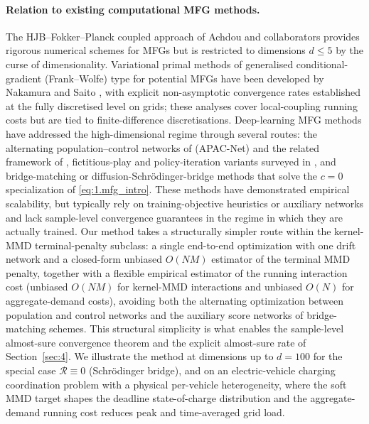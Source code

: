 \documentclass[11pt,leqno]{article}
\theoremstyle{plain}
\theoremstyle{remark}
\theoremstyle{definition}
\numberwithin{equation}{section}
\numberwithin{figure}{section}
\numberwithin{table}{section}
\numberwithin{algorithm}{section}
\begin{document}
\paragraph{Relation to existing computational MFG methods.}
The HJB--Fokker--Planck coupled approach of Achdou and collaborators \cite{ach-cap:2010,ach-cam-cap:2012}
provides rigorous numerical schemes for MFGs but is restricted to dimensions $d\le 5$ by the curse of dimensionality.
Variational primal methods of generalised conditional-gradient (Frank--Wolfe) type for potential MFGs
have been developed by Nakamura and Saito \cite{nakam-sai:2026loc,nakam-sai:2026disc},
with explicit non-asymptotic convergence rates established at the fully discretised level on grids;
these analyses cover local-coupling running costs but are tied to finite-difference discretisations.
Deep-learning MFG methods have addressed the high-dimensional regime through several routes:
the alternating population--control networks of \cite{lin-etal:2021apac} (APAC-Net) and the related framework of \cite{rut-etal:2020},
fictitious-play and policy-iteration variants surveyed in \cite{car-lau:2022,car-lau:2021},
and bridge-matching or diffusion-Schr{\"o}dinger-bridge methods
\cite{de-etal:2021,var-etal:2021,shi-etal:2023dsbm,Tong2024}
that solve the $c=0$ specialization of \eqref{eq:1.mfg_intro}.
These methods have demonstrated empirical scalability,
but typically rely on training-objective heuristics or auxiliary networks
and lack sample-level convergence guarantees in the regime in which they are actually trained.
Our method takes a structurally simpler route within the kernel-MMD terminal-penalty subclass:
a single end-to-end optimization with one drift network and a closed-form unbiased $O(NM)$ estimator of the terminal MMD penalty,
together with a flexible empirical estimator of the running interaction cost
(unbiased $O(NM)$ for kernel-MMD interactions and unbiased $O(N)$ for aggregate-demand costs),
avoiding both the alternating optimization between population and control networks and the auxiliary score networks of bridge-matching schemes.
This structural simplicity is what enables the sample-level almost-sure convergence theorem and the explicit almost-sure rate of Section~\ref{sec:4}.
We illustrate the method at dimensions up to $d=100$ for the special case $\mathcal{R}\equiv 0$ (Schr{\"o}dinger bridge),
and on an electric-vehicle charging coordination problem
with a physical per-vehicle heterogeneity, where the soft MMD target shapes the deadline state-of-charge distribution
and the aggregate-demand running cost reduces peak and time-averaged grid load.
\end{document}
